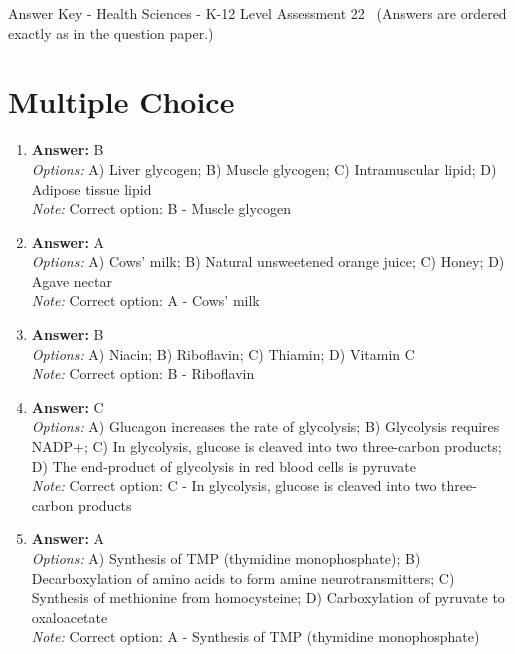 \documentclass[12pt]{article}
\begin{document}
\begin{center}
Answer Key - Health Sciences - K-12 Level Assessment 22 \
\small (Answers are ordered exactly as in the question paper.)
\end{center}

\section*{Multiple Choice}
\begin{enumerate}[label=\arabic*.]
\item \textbf{Answer:} B
\\ \textit{Options:} A) Liver glycogen; B) Muscle glycogen; C) Intramuscular lipid; D) Adipose tissue lipid
\\ \textit{Note:} Correct option: B - Muscle glycogen
\item \textbf{Answer:} A
\\ \textit{Options:} A) Cows' milk; B) Natural unsweetened orange juice; C) Honey; D) Agave nectar
\\ \textit{Note:} Correct option: A - Cows' milk
\item \textbf{Answer:} B
\\ \textit{Options:} A) Niacin; B) Riboflavin; C) Thiamin; D) Vitamin C
\\ \textit{Note:} Correct option: B - Riboflavin
\item \textbf{Answer:} C
\\ \textit{Options:} A) Glucagon increases the rate of glycolysis; B) Glycolysis requires NADP+; C) In glycolysis, glucose is cleaved into two three-carbon products; D) The end-product of glycolysis in red blood cells is pyruvate
\\ \textit{Note:} Correct option: C - In glycolysis, glucose is cleaved into two three-carbon products
\item \textbf{Answer:} A
\\ \textit{Options:} A) Synthesis of TMP (thymidine monophosphate); B) Decarboxylation of amino acids to form amine neurotransmitters; C) Synthesis of methionine from homocysteine; D) Carboxylation of pyruvate to oxaloacetate
\\ \textit{Note:} Correct option: A - Synthesis of TMP (thymidine monophosphate)
\end{enumerate}
\end{document}
